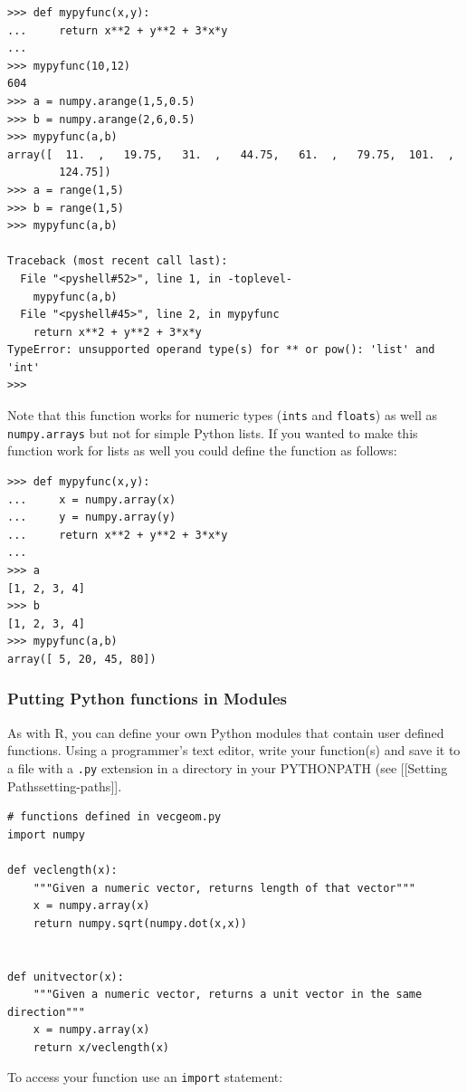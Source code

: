 \documentclass{article}
\begin{document}
\begin{lstlisting}
>>> def mypyfunc(x,y):
...     return x**2 + y**2 + 3*x*y
... 
>>> mypyfunc(10,12)
604
>>> a = numpy.arange(1,5,0.5)
>>> b = numpy.arange(2,6,0.5)
>>> mypyfunc(a,b)
array([  11.  ,   19.75,   31.  ,   44.75,   61.  ,   79.75,  101.  ,
        124.75])
>>> a = range(1,5)
>>> b = range(1,5)
>>> mypyfunc(a,b)

Traceback (most recent call last):
  File "<pyshell#52>", line 1, in -toplevel-
    mypyfunc(a,b)
  File "<pyshell#45>", line 2, in mypyfunc
    return x**2 + y**2 + 3*x*y
TypeError: unsupported operand type(s) for ** or pow(): 'list' and 'int'
>>> 
\end{lstlisting}
Note that this function works for numeric types (\lstinline!ints! and
\lstinline!floats!) as well as \lstinline!numpy.arrays! but not for
simple Python lists. If you wanted to make this function work for lists
as well you could define the function as follows:

\begin{lstlisting}
>>> def mypyfunc(x,y):
...     x = numpy.array(x)
...     y = numpy.array(y)
...     return x**2 + y**2 + 3*x*y
... 
>>> a
[1, 2, 3, 4]
>>> b
[1, 2, 3, 4]
>>> mypyfunc(a,b)
array([ 5, 20, 45, 80])
\end{lstlisting}
\subsubsection{Putting Python functions in Modules}

As with R, you can define your own Python modules that contain user
defined functions. Using a programmer's text editor, write your
function(s) and save it to a file with a \lstinline!.py! extension in a
directory in your PYTHONPATH (see {[}{[}Setting
Paths\textbar{}setting-paths{]}{]}.

\begin{lstlisting}
# functions defined in vecgeom.py
import numpy

def veclength(x):
    """Given a numeric vector, returns length of that vector""" 
    x = numpy.array(x)
    return numpy.sqrt(numpy.dot(x,x))


def unitvector(x):
    """Given a numeric vector, returns a unit vector in the same direction"""
    x = numpy.array(x)
    return x/veclength(x)
\end{lstlisting}
To access your function use an \lstinline!import! statement:
\end{document}
